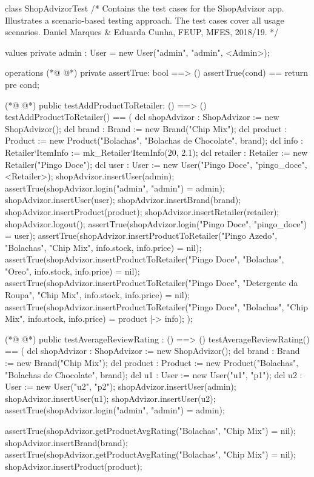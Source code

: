 \begin{vdmpp}[breaklines=true]
class ShopAdvizorTest
/*
  Contains the test cases for the ShopAdvizor app.
  Illustrates a scenario-based testing approach.
  The test cases cover all usage scenarios.
  Daniel Marques & Eduarda Cunha, FEUP, MFES, 2018/19.
*/

 values
  private admin : User = new User("admin", "admin", <Admin>);
  
 operations
(*@
\label{assertTrue:13}
@*)
  private assertTrue: bool ==> ()
  assertTrue(cond) == return
  pre cond;
 
(*@
\label{testAddProductToRetailer:17}
@*)
  public testAddProductToRetailer: () ==> ()
  testAddProductToRetailer() ==
  (
   dcl shopAdvizor : ShopAdvizor := new ShopAdvizor();
   dcl brand : Brand := new Brand("Chip Mix");
   dcl product : Product := new Product("Bolachas", "Bolachas de Chocolate", brand);
   dcl info : Retailer`ItemInfo := mk_Retailer`ItemInfo(20, 2.1);
   dcl retailer : Retailer := new Retailer("Pingo Doce");
   dcl user : User := new User("Pingo Doce", "pingo_doce", <Retailer>);
  shopAdvizor.insertUser(admin);
  assertTrue(shopAdvizor.login("admin", "admin") = admin);
   shopAdvizor.insertUser(user);
   shopAdvizor.insertBrand(brand);
   shopAdvizor.insertProduct(product);
   shopAdvizor.insertRetailer(retailer);
   shopAdvizor.logout();
   assertTrue(shopAdvizor.login("Pingo Doce", "pingo_doce") = user);
   assertTrue(shopAdvizor.insertProductToRetailer("Pingo Azedo", "Bolachas", "Chip Mix", info.stock, info.price) = nil);
   assertTrue(shopAdvizor.insertProductToRetailer("Pingo Doce", "Bolachas", "Oreo", info.stock, info.price) = nil);
   assertTrue(shopAdvizor.insertProductToRetailer("Pingo Doce", "Detergente da Roupa", "Chip Mix", info.stock, info.price) = nil);
   assertTrue(shopAdvizor.insertProductToRetailer("Pingo Doce", "Bolachas", "Chip Mix", info.stock, info.price) = {product |-> info});
  );
  
(*@
\label{testAverageReviewRating:40}
@*)
  public testAverageReviewRating : () ==> ()
  testAverageReviewRating() == 
  (
   dcl shopAdvizor : ShopAdvizor := new ShopAdvizor();
   dcl brand : Brand := new Brand("Chip Mix");
   dcl product : Product := new Product("Bolachas", "Bolachas de Chocolate", brand);
   dcl u1 : User := new User("u1", "p1");
   dcl u2 : User := new User("u2", "p2");
  shopAdvizor.insertUser(admin);
  shopAdvizor.insertUser(u1);
  shopAdvizor.insertUser(u2);
  assertTrue(shopAdvizor.login("admin", "admin") = admin);
  
   assertTrue(shopAdvizor.getProductAvgRating("Bolachas", "Chip Mix") = nil);
  shopAdvizor.insertBrand(brand);
   assertTrue(shopAdvizor.getProductAvgRating("Bolachas", "Chip Mix") = nil);
  shopAdvizor.insertProduct(product);
   

\end{vdmpp}
